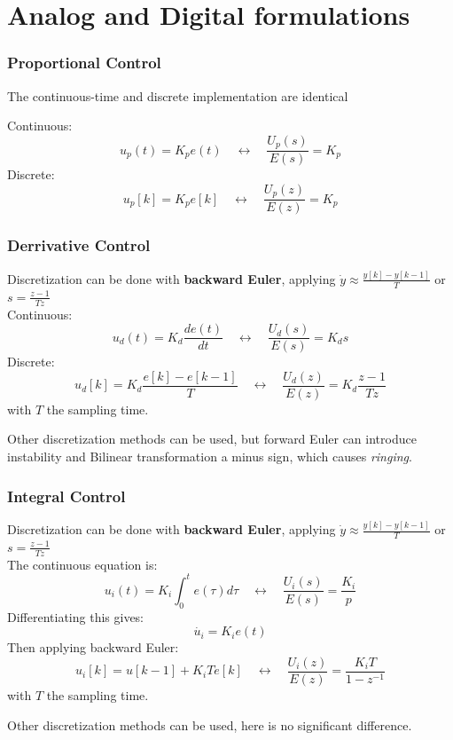 \section{Analog and Digital formulations}

\begin{frame}
	\frametitle{Proportional Control}
	The continuous-time and discrete implementation are identical
	
	Continuous:
	\begin{equation*}
		u_p(t) = K_p e(t) \quad \leftrightarrow \quad \frac{U_p(s)}{E(s)} = K_p 
	\end{equation*}
	Discrete:
	\begin{equation*}
		u_p[k] = K_p e[k] \quad \leftrightarrow \quad \frac{U_p(z)}{E(z)} = K_p 
	\end{equation*}
\end{frame}

\begin{frame}
	\frametitle{Derrivative Control}
	Discretization can be done with \textbf{backward Euler}, applying $\dot{y} \approx \frac{y[k]-y[k-1]}{T}$ or $s = \frac{z - 1}{Tz}$ \\
	Continuous:
	\begin{equation*}
		u_d(t) = K_d \frac{de(t)}{dt} \quad \leftrightarrow \quad \frac{U_d(s)}{E(s)} = K_d s 
	\end{equation*}
	Discrete:
	\begin{equation*}
	u_d[k] = K_d \frac{ e[k] - e[k-1]}{T} \quad \leftrightarrow \quad \frac{U_d(z)}{E(z)} = K_d \frac{z - 1}{Tz}
	\end{equation*}
	with $T$ the sampling time.
	
	Other discretization methods can be used, but forward Euler can introduce instability and Bilinear transformation a minus sign, which causes \emph{ringing}.
\end{frame}

\begin{frame}
	\frametitle{Integral Control}
	Discretization can be done with \textbf{backward Euler}, applying $\dot{y} \approx \frac{y[k]-y[k-1]}{T}$ or $s = \frac{z - 1}{Tz}$ \\
	The continuous equation is:
	\begin{equation*}
		u_i(t) = K_i \int_0^t e(\tau)d\tau \quad \leftrightarrow \quad \frac{U_i(s)}{E(s)} = \frac{K_i}{p} 
	\end{equation*}
	Differentiating this gives:
	\begin{equation*}
		\dot{u_i} = K_i e(t)
	\end{equation*}
	Then applying backward Euler:
	\begin{equation*}
	u_i[k] = u[k-1] + K_i T e[k] \quad \leftrightarrow \quad \frac{U_i(z)}{E(z)} =  \frac{K_i T}{1 - z^{-1}}
	\end{equation*}
	with $T$ the sampling time.
	
	Other discretization methods can be used, here is no significant difference.
\end{frame}

